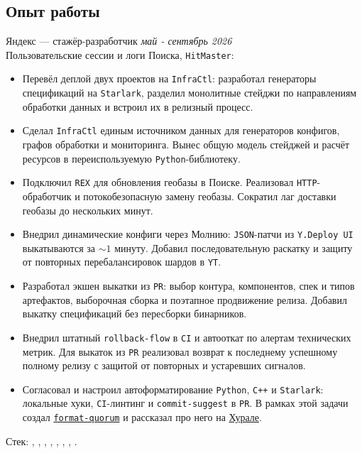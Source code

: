 \documentclass[margin,line]{resume}
\begin{document}
\begin{resume}
  \section{\mysidestyle Опыт работы}\vspace{0.7mm}
  Яндекс --- стажёр-разработчик \hfill {\color{black!50}\textit{май - сентябрь 2026}}\\[1.5mm]
  Пользовательские сессии и логи Поиска, \texttt{HitMaster}:
  \begin{itemize}[leftmargin=4mm, itemsep=0pt, topsep=1pt, parsep=0pt, label=\raisebox{0.2ex}{\scalebox{0.6}{\textbullet}}]
    \item Перевёл деплой двух проектов на \texttt{InfraCtl}: разработал
        генераторы спецификаций на \texttt{Starlark}, разделил монолитные
        стейджи по направлениям обработки данных и встроил их в релизный процесс.
    \item Сделал \texttt{InfraCtl} единым источником данных для генераторов
        конфигов, графов обработки и мониторинга. Вынес общую модель стейджей и
        расчёт ресурсов в переиспользуемую \texttt{Python}-библиотеку.
    \item Подключил \texttt{REX} для обновления геобазы в Поиске. Реализовал
        \texttt{HTTP}-обработчик и потокобезопасную замену геобазы. Сократил
        лаг доставки геобазы до нескольких минут.
    \item Внедрил динамические конфиги через Молнию: \texttt{JSON}-патчи из
        \texttt{Y.Deploy UI} выкатываются за $\sim 1$ минуту. Добавил
        последовательную раскатку и защиту от повторных перебалансировок шардов
        в \texttt{YT}.
    \item Разработал экшен выкатки из \texttt{PR}: выбор контура, компонентов,
        спек и типов артефактов, выборочная сборка и поэтапное продвижение
        релиза. Добавил выкатку спецификаций без пересборки бинарников.
    \item Внедрил штатный \texttt{rollback-flow} в \texttt{CI} и автооткат
        по алертам технических метрик. Для выкаток из \texttt{PR}
        реализовал возврат к последнему успешному полному релизу с защитой
        от повторных и устаревших сигналов.
    \item Согласовал и настроил автоформатирование \texttt{Python}, \texttt{C++}
        и \texttt{Starlark}: локальные хуки, \texttt{CI}-линтинг и
        \texttt{commit-suggest} в \texttt{PR}. В рамках этой задачи создал
        \href{https://fq.alchemmist.xyz}{\texttt{format-quorum}} и рассказал про него на
        \href{https://www.youtube.com/watch?v=cz_K6YEIQho}{Хурале}.
  \end{itemize}\vspace{-2mm}
  Стек: , , ,
  , , ,
  , .


\end{resume}
\end{document}
